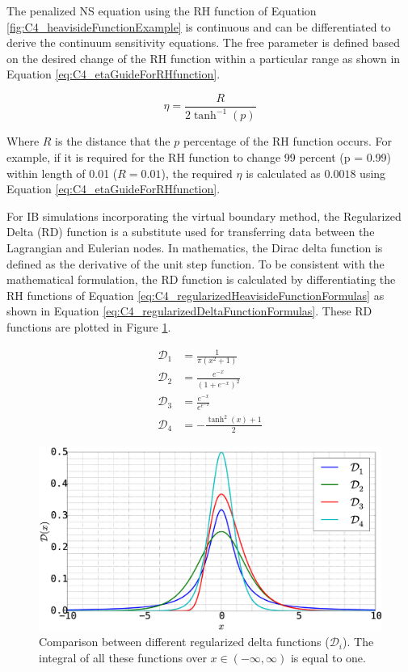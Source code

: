 The penalized NS equation using the RH function of Equation \eqref{fig:C4_heavisideFunctionExample} is continuous and can be differentiated to derive the continuum sensitivity equations. The free parameter is defined based on the desired change of the RH function within a particular range as shown in Equation \eqref{eq:C4_etaGuideForRHfunction}.

\begin{equation}\label{eq:C4_etaGuideForRHfunction}
    \eta = \frac{R}{2 \tanh^{-1} (p)}
\end{equation}

Where $R$ is the distance that the $p$ percentage of the RH function occurs. For example, if it is required for the RH function to change 99 percent (p = 0.99) within length of 0.01 ($R = 0.01$), the required $\eta$ is calculated as $0.0018$ using Equation \eqref{eq:C4_etaGuideForRHfunction}.

For IB simulations incorporating the virtual boundary method, the Regularized Delta (RD) function is a substitute used for transferring data between the Lagrangian and Eulerian nodes. In mathematics, the Dirac delta function is defined as the derivative of the unit step function. To be consistent with the mathematical formulation, the RD function is calculated by differentiating the RH functions of Equation \eqref{eq:C4_regularizedHeavisideFunctionFormulas} as shown in Equation \eqref{eq:C4_regularizedDeltaFunctionFormulas}. These RD functions are plotted in Figure \ref{fig:C4_deltaFunctionExample}.

\begin{subequations}\label{eq:C4_regularizedDeltaFunctionFormulas}
\begin{align}
    \mathcal{D}_1 &= \frac{1}{\pi \left(x^{2} + 1\right)} \\
    \mathcal{D}_2 &= \frac{e^{- x}}{\left(1 + e^{- x}\right)^{2}} \\
    \mathcal{D}_3 &= \frac{e^{- x}}{e^{e^{- x}}} \\
    \mathcal{D}_4 &= - \frac{\tanh^{2}{\left (x \right )} + 1}{2}
\end{align}
\end{subequations}

\begin{figure}[H]
    \centering
    \includegraphics[width=12.00cm]{Chapter_4/figure/delta_function_example.eps}
    \caption{Comparison between different regularized delta functions ($\mathcal{D}_i$). The integral of all these functions over $x\in(-\infty, \infty)$ is equal to one.}
    \label{fig:C4_deltaFunctionExample}
\end{figure}

